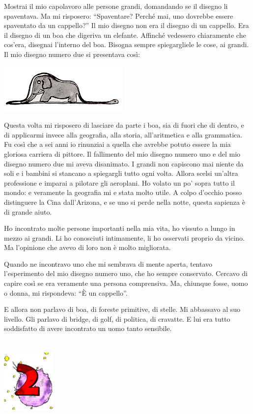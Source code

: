 \documentclass[11pt]{scrbook}
\begin{document}
Mostrai il mio capolavoro alle persone grandi, domandando se il disegno li spaventava. Ma mi risposero: ``Spaventare? Perché mai, uno dovrebbe essere spaventato da un cappello?'' Il mio disegno non era il disegno di un cappello. Era il disegno di un boa che digeriva un elefante. Affinché  vedessero chiaramente che cos'era, disegnai l'interno del boa. Bisogna sempre spiegargliele le cose, ai grandi. Il mio disegno numero due si presentava così:

\begin{center}
\includegraphics{img/boa}
\end{center}

Questa volta mi risposero di lasciare da parte i boa, sia di fuori che di dentro, e di applicarmi invece alla geografia, alla storia, all'aritmetica e alla grammatica. Fu così che a sei anni io rinunziai a quella che avrebbe potuto essere la mia gloriosa carriera di pittore. Il fallimento del mio disegno numero uno e del mio disegno numero due mi aveva disanimato. I grandi non capiscono mai niente da soli e i bambini si stancano a spiegargli tutto ogni volta. Allora scelsi un'altra professione e imparai a pilotare gli aeroplani. Ho volato un po' sopra tutto il mondo: e veramente la geografia mi e stata molto utile. A colpo d'occhio posso distinguere la Cina dall'Arizona, e se uno si perde nella notte, questa sapienza è di grande aiuto.

Ho incontrato molte persone importanti nella mia vita, ho vissuto a lungo in mezzo ai grandi. Li ho conosciuti intimamente, li ho osservati proprio da vicino. Ma l'opinione che avevo di loro non è molto migliorata.

Quando ne incontravo uno che mi sembrava di mente aperta, tentavo l'esperimento del mio disegno numero uno, che ho sempre conservato. Cercavo di capire così se era veramente una persona comprensiva. Ma, chiunque fosse, uomo o donna, mi rispondeva: ``È un cappello''.

E allora non parlavo di boa, di foreste primitive, di stelle. Mi abbassavo al suo livello. Gli parlavo di bridge, di golf, di politica, di cravatte. E lui era tutto soddisfatto di avere incontrato un uomo tanto sensibile.

\chapter{}
\begin{center}
\includegraphics{img/chapter2}
\end{center}
\end{document}

